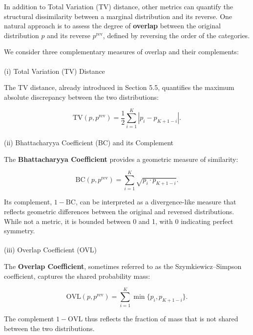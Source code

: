 \documentclass[
  12pt,
]{article}
\makeatletter
\let\oldparagraph\paragraph
\renewcommand{\paragraph}{
    \@ifstar
      \xxxParagraphStar
      \xxxParagraphNoStar
  }
\newcommand{\xxxParagraphStar}[1]{\oldparagraph*{#1}\mbox{}}
\newcommand{\xxxParagraphNoStar}[1]{\oldparagraph{#1}\mbox{}}
\theoremstyle{plain}
\theoremstyle{definition}
\theoremstyle{remark}
\makeatother
\begin{document}
In addition to Total Variation (TV) distance, other metrics can quantify
the structural dissimilarity between a marginal distribution and its
reverse. One natural approach is to assess the degree of
\textbf{overlap} between the original distribution \(p\) and its reverse
\(p^{\mathrm{rev}}\), defined by reversing the order of the categories.

We consider three complementary measures of overlap and their
complements:

\paragraph{(i) Total Variation (TV)
Distance}\label{i-total-variation-tv-distance}

The TV distance, already introduced in Section 5.5, quantifies the
maximum absolute discrepancy between the two distributions:

\[
\text{TV}(p, p^{\mathrm{rev}}) = \frac{1}{2} \sum_{i=1}^{K} \left| p_i - p_{K+1 - i} \right|.
\]

\paragraph{(ii) Bhattacharyya Coefficient (BC) and its
Complement}\label{ii-bhattacharyya-coefficient-bc-and-its-complement}

The \textbf{Bhattacharyya Coefficient} provides a geometric measure of
similarity:

\[
\text{BC}(p, p^{\mathrm{rev}}) = \sum_{i=1}^{K} \sqrt{ p_i \cdot p_{K+1 - i} }.
\]

Its complement, \(1 - \text{BC}\), can be interpreted as a
divergence-like measure that reflects geometric differences between the
original and reversed distributions. While not a metric, it is bounded
between 0 and 1, with 0 indicating perfect symmetry.

\paragraph{(iii) Overlap Coefficient
(OVL)}\label{iii-overlap-coefficient-ovl}

The \textbf{Overlap Coefficient}, sometimes referred to as the
Szymkiewicz--Simpson coefficient, captures the shared probability mass:

\[
\text{OVL}(p, p^{\mathrm{rev}}) = \sum_{i=1}^{K} \min\{ p_i, p_{K+1 - i} \}.
\]

The complement \(1 - \text{OVL}\) thus reflects the fraction of mass
that is not shared between the two distributions.
\end{document}
